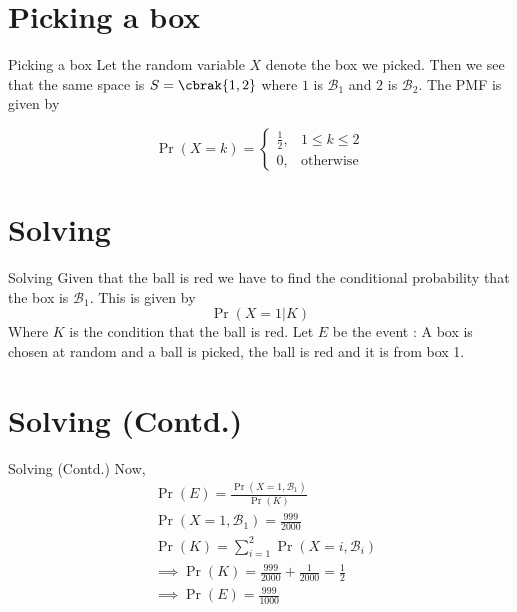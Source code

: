 \documentclass{beamer}
\providecommand{\pr}[1]{\ensuremath{\Pr\left(#1\right)}}
\begin{document}
\section{Picking a box}
\begin{frame} {Picking a box}
Let the random variable $X$ denote the box we picked. Then we see that the same space is $S = \cbrak{1,2}$ where $1$ is $\mathcal{B}_1$ and $2$ is $\mathcal{B}_2$. The PMF is given by
 
\begin{equation}
\pr{X = k} = 
\begin{cases}
\frac{1}{2}, & 1 \leq k \leq 2 \\
0, & \text{otherwise}
\end{cases}
\label{pmf}
\end{equation}
\end{frame}

\section{Solving}
\begin{frame}{Solving}
    Given that the ball is red we have to find the conditional probability that the box is $\mathcal{B}_1$. This is given by
\begin{equation}
    \pr{X = 1 | K}
\end{equation}
Where $K$ is the condition that the ball is red.\newline 
Let $E$ be the event : A box is chosen at random and a ball is picked, the ball is red and it is from box 1.
\end{frame}

\section{Solving (Contd.)}
\begin{frame}{Solving (Contd.)}
Now,
\begin{align}
   & \pr{E} = \frac{\pr{X = 1 , \mathcal{B}_1}}{\pr{K}} \\
    &\pr{X = 1 , \mathcal{B}_1} = \frac{999}{2000} \\
    &\pr{K} = \sum_{i = 1}^{2}{\pr{X = i , \mathcal{B}_i}} \\
    &\implies \pr{K} = \frac{999}{2000} + \frac{1}{2000} = \frac{1}{2} \\
    &\implies \pr{E} = \frac{999}{1000}
\end{align}
\end{frame}
\end{document}

